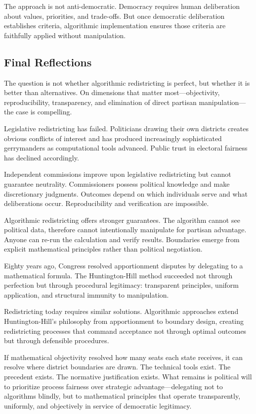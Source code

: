 The approach is not anti-democratic. Democracy requires human deliberation about values, priorities, and trade-offs. But once democratic deliberation establishes criteria, algorithmic implementation ensures those criteria are faithfully applied without manipulation.

\subsection{Final Reflections}

The question is not whether algorithmic redistricting is perfect, but whether it is better than alternatives. On dimensions that matter most—objectivity, reproducibility, transparency, and elimination of direct partisan manipulation—the case is compelling.

Legislative redistricting has failed. Politicians drawing their own districts creates obvious conflicts of interest and has produced increasingly sophisticated gerrymanders as computational tools advanced. Public trust in electoral fairness has declined accordingly.

Independent commissions improve upon legislative redistricting but cannot guarantee neutrality. Commissioners possess political knowledge and make discretionary judgments. Outcomes depend on which individuals serve and what deliberations occur. Reproducibility and verification are impossible.

Algorithmic redistricting offers stronger guarantees. The algorithm cannot see political data, therefore cannot intentionally manipulate for partisan advantage. Anyone can re-run the calculation and verify results. Boundaries emerge from explicit mathematical principles rather than political negotiation.

Eighty years ago, Congress resolved apportionment disputes by delegating to a mathematical formula. The Huntington-Hill method succeeded not through perfection but through procedural legitimacy: transparent principles, uniform application, and structural immunity to manipulation.

Redistricting today requires similar solutions. Algorithmic approaches extend Huntington-Hill's philosophy from apportionment to boundary design, creating redistricting processes that command acceptance not through optimal outcomes but through defensible procedures.

If mathematical objectivity resolved how many seats each state receives, it can resolve where district boundaries are drawn. The technical tools exist. The precedent exists. The normative justification exists. What remains is political will to prioritize process fairness over strategic advantage—delegating not to algorithms blindly, but to mathematical principles that operate transparently, uniformly, and objectively in service of democratic legitimacy.
